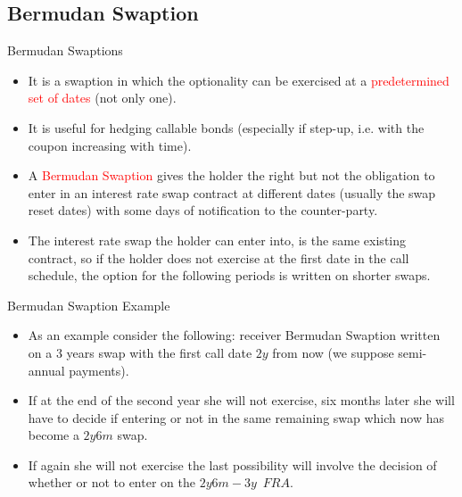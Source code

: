 \documentclass{beamer}
\begin{document}
\subsection{Bermudan Swaption}
\begin{frame}{Bermudan Swaptions}
\begin{itemize}
	\item<1-> It is a swaption in which the optionality can be exercised at a \textcolor{red}{predetermined set of dates} (not only one).
	\item<2-> It is useful for hedging callable bonds (especially if step-up, i.e. with the coupon increasing with time).
	\item<3-> A \textcolor{red}{Bermudan Swaption} gives the holder the right but not the obligation to enter in an interest rate swap contract at different dates (usually the swap reset dates) with some days of notification to the counter-party.
	\item<4-> The interest rate swap the holder can enter into, is the same existing contract, so if the holder does not exercise at the first date in the call schedule, the option for the following periods is written on shorter swaps.
\end{itemize}
\end{frame}

\begin{frame}{Bermudan Swaption Example}
\begin{itemize}
	\item<1-> As an example consider the following: receiver Bermudan Swaption written on a 3 years swap with the first call date $2y$ from now (we suppose semi-annual payments).
	\item<2-> If at the end of the second year she will not exercise, six months later she will have to decide if entering or not in the same remaining swap which now has become a $2y6m$ swap.
	\item<3-> If again she will not exercise the last possibility will involve the decision of whether or not to enter on the $2y6m-3y$~$FRA$.
\end{itemize}
\end{frame}		
\end{document}
